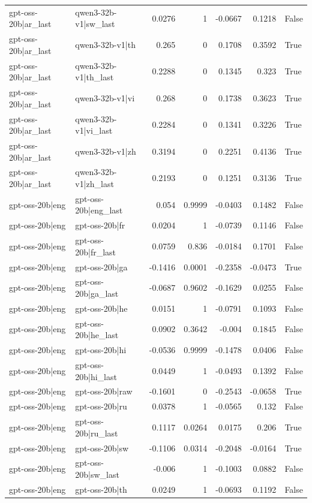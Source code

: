 \begin{table}
\begin{tabular}{l l r r r r l}
gpt-oss-20b|ar_last & qwen3-32b-v1|sw_last & 0.0276 & 1 & -0.0667 & 0.1218 & False \\
gpt-oss-20b|ar_last & qwen3-32b-v1|th & 0.265 & 0 & 0.1708 & 0.3592 & True \\
gpt-oss-20b|ar_last & qwen3-32b-v1|th_last & 0.2288 & 0 & 0.1345 & 0.323 & True \\
gpt-oss-20b|ar_last & qwen3-32b-v1|vi & 0.268 & 0 & 0.1738 & 0.3623 & True \\
gpt-oss-20b|ar_last & qwen3-32b-v1|vi_last & 0.2284 & 0 & 0.1341 & 0.3226 & True \\
gpt-oss-20b|ar_last & qwen3-32b-v1|zh & 0.3194 & 0 & 0.2251 & 0.4136 & True \\
gpt-oss-20b|ar_last & qwen3-32b-v1|zh_last & 0.2193 & 0 & 0.1251 & 0.3136 & True \\
gpt-oss-20b|eng & gpt-oss-20b|eng_last & 0.054 & 0.9999 & -0.0403 & 0.1482 & False \\
gpt-oss-20b|eng & gpt-oss-20b|fr & 0.0204 & 1 & -0.0739 & 0.1146 & False \\
gpt-oss-20b|eng & gpt-oss-20b|fr_last & 0.0759 & 0.836 & -0.0184 & 0.1701 & False \\
gpt-oss-20b|eng & gpt-oss-20b|ga & -0.1416 & 0.0001 & -0.2358 & -0.0473 & True \\
gpt-oss-20b|eng & gpt-oss-20b|ga_last & -0.0687 & 0.9602 & -0.1629 & 0.0255 & False \\
gpt-oss-20b|eng & gpt-oss-20b|he & 0.0151 & 1 & -0.0791 & 0.1093 & False \\
gpt-oss-20b|eng & gpt-oss-20b|he_last & 0.0902 & 0.3642 & -0.004 & 0.1845 & False \\
gpt-oss-20b|eng & gpt-oss-20b|hi & -0.0536 & 0.9999 & -0.1478 & 0.0406 & False \\
gpt-oss-20b|eng & gpt-oss-20b|hi_last & 0.0449 & 1 & -0.0493 & 0.1392 & False \\
gpt-oss-20b|eng & gpt-oss-20b|raw & -0.1601 & 0 & -0.2543 & -0.0658 & True \\
gpt-oss-20b|eng & gpt-oss-20b|ru & 0.0378 & 1 & -0.0565 & 0.132 & False \\
gpt-oss-20b|eng & gpt-oss-20b|ru_last & 0.1117 & 0.0264 & 0.0175 & 0.206 & True \\
gpt-oss-20b|eng & gpt-oss-20b|sw & -0.1106 & 0.0314 & -0.2048 & -0.0164 & True \\
gpt-oss-20b|eng & gpt-oss-20b|sw_last & -0.006 & 1 & -0.1003 & 0.0882 & False \\
gpt-oss-20b|eng & gpt-oss-20b|th & 0.0249 & 1 & -0.0693 & 0.1192 & False \\

\end{tabular}
\end{table}
